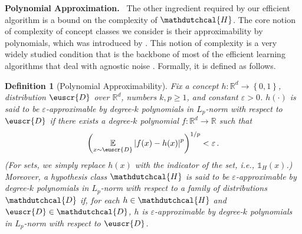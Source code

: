 \documentclass[11pt]{article}
\theoremstyle{plain}
\newtheorem{definition}{Definition}
\theoremstyle{definition}
\theoremstyle{remark}
\def\abs#1{\left| #1 \right|}
\newcommand{\inbrace}[1]{\left\{#1\right\}}
\newcommand{\inparen}[1]{\left(#1\right)}
\newcommand{\R}{\mathbb{R}}
\newcommand{\E}{\operatornamewithlimits{\mathbb{E}}}
\newcommand{\Ex}{\E}
\newcommand\ind{\mathds{1}}
\newcommand{\sfrac}[2]{{#1/#2}}
\newcommand{\eps}{\varepsilon}
\newcommand{\customcal}[1]{\euscr{#1}}
\newcommand{\cD}{\customcal{D}}
\renewcommand{\paragraph}[1]{\medskip \noindent\textbf{#1}~}
\newcommand{\ie}{\textit{i.e.}}
\newcommand{\hypo}[1]{\mathdutchcal{#1}}
\newcommand{\hyD}{\hypo{D}}
\newcommand{\hyH}{\hypo{H}}
\newcommand{\nL}{L}
\begin{document}
        \paragraph{Polynomial Approximation.}
            The other ingredient required by our efficient algorithm is a bound on the complexity of $\hyH$.
            The core notion of complexity of concept classes we consider is their approximability by polynomials, which was introduced by \citet*{kalai2008agnostically}.
            This notion of complexity is a very widely studied condition that is the backbone of most of the efficient learning algorithms that deal with agnostic noise \cite{kalai2008agnostically,kane2013learning,Blais:2010aa,10.1145/1806689.1806763,10.1007/978-3-642-15369-3_44,10.1145/2395116.2395118,5670941}. 
            Formally, it is defined as follows.
            \begin{definition}[Polynomial Approximability]\label{def:poly_approx}
                Fix a concept $h\colon \R^d \to \inbrace{0,1}$, distribution $\cD$ over $\R^d$, numbers $k,p\geq 1$, and constant $\eps>0$.
                $h(\cdot)$ is said to be $\eps$-approximable by degree-$k$ polynomials in $\nL_p$-norm with respect to $\cD$ if there exists a degree-$k$ polynomial $f\colon \R^d\to\R$ such that 
                \[
                    \inparen{\Ex_{x\sim \cD}{\abs{f(x)-h(x)}^p}}^{\sfrac{1}{p}} < \eps\,.  
                \]
                (For sets, we simply replace $h(x)$ with the indicator of the set, \ie{}, $\ind_H(x)$.)
                Moreover, a hypothesis class $\hyH$ is said to be $\eps$-approximable by degree-$k$ polynomials in $\nL_p$-norm with respect to a family of distributions $\hyD$ if, for each $h\in \hyH$ and $\cD\in \hyD$, $h$ is  $\eps$-approximable by degree-$k$ polynomials in $\nL_p$-norm with respect to $\cD$. 
            \end{definition}
\end{document}
